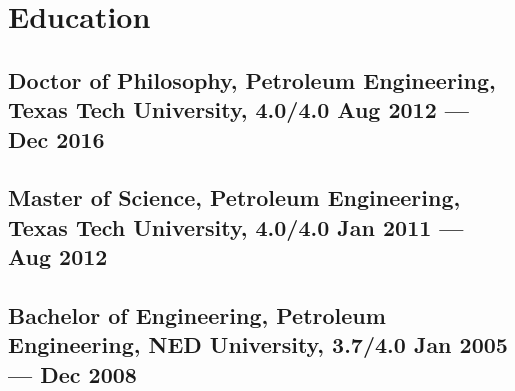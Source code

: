 \documentclass[letter,10pt]{article}
\newenvironment{zitemize}{
	\begin{itemize}\itemsep0pt \parskip0pt \parsep1pt}
	{\end{itemize}\vspace{-0.5cm}}
\begin{document}
	
	
	\section{Education }
	\subsection*{Doctor of Philosophy, Petroleum Engineering, {\normalsize \normalfont Texas Tech University, 4.0/4.0} \hfill Aug 2012 --- Dec 2016} 
	\vspace{0.1cm}
	\subsection*{Master of Science, Petroleum Engineering, {\normalsize \normalfont Texas Tech University, 4.0/4.0} \hfill Jan 2011 --- Aug 2012} 
	\vspace{0.1cm}
	\subsection*{Bachelor of Engineering, Petroleum Engineering, {\normalsize \normalfont NED University, 3.7/4.0} \hfill Jan 2005 --- Dec 2008} 
	\vspace{0.2cm}
	
	
	
	
	
\end{document}

